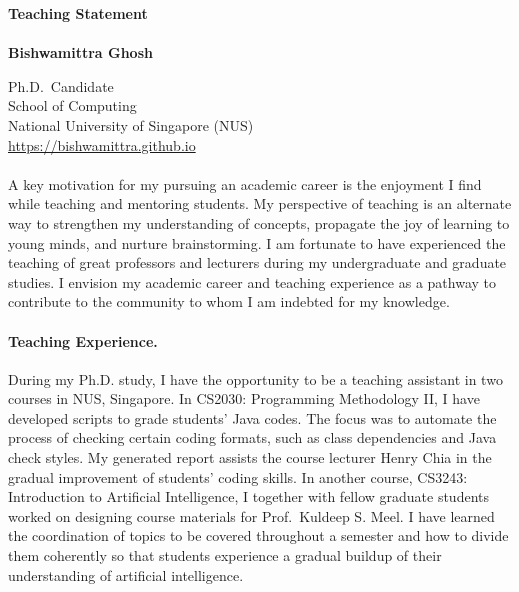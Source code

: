 \documentclass[11pt]{article}
\newcommand{\blue}[1]{\textcolor{blue}{#1}}
\begin{document}
	\noindent\huge \textbf{Teaching Statement} \\
	\vspace{0.1em}\\
	\Large \textbf{Bishwamittra Ghosh}
		
	\normalsize
	\noindent Ph.D.\ Candidate\\
	School of Computing\\
	National University of Singapore (NUS)\\
	\blue{\url{https://bishwamittra.github.io}}



	\paragraph{}
		A key motivation for my pursuing an academic career is the enjoyment I find while teaching and mentoring students. My perspective of teaching is an alternate way to strengthen my understanding of concepts, propagate the joy of learning to young minds, and nurture brainstorming. I am fortunate to have experienced the teaching of great professors and lecturers during my undergraduate and graduate studies. I envision my academic career and teaching experience as a pathway to contribute to the community to whom I am indebted for my knowledge.
		
	
	\paragraph{Teaching Experience.}
		During my Ph.D. study, I have the opportunity to be a teaching assistant in two courses in NUS, Singapore. In CS2030: Programming Methodology II, I have developed scripts to grade students' Java codes. The focus was to automate the process of checking certain coding formats, such as class dependencies and Java check styles. My generated report assists the course lecturer Henry Chia in the gradual improvement of students' coding skills. In another course, CS3243: Introduction to Artificial Intelligence, I together with fellow graduate students worked on designing course materials for Prof.\ Kuldeep S. Meel. I have learned the coordination of topics to be covered throughout a semester and how to divide them coherently so that students experience a gradual buildup of their understanding of artificial intelligence.
		
\end{document}
